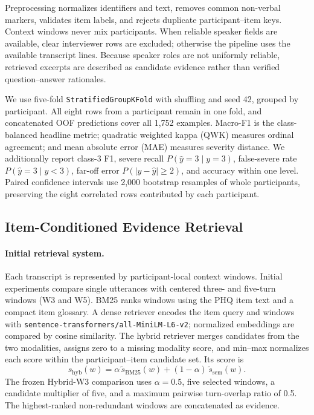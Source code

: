 \documentclass{article}
\begin{document}
Preprocessing normalizes identifiers and text, removes common non-verbal markers, validates item labels, and rejects duplicate participant--item keys. Context windows never mix participants. When reliable speaker fields are available, clear interviewer rows are excluded; otherwise the pipeline uses the available transcript lines. Because speaker roles are not uniformly reliable, retrieved excerpts are described as candidate evidence rather than verified question--answer rationales.

We use five-fold \texttt{StratifiedGroupKFold} with shuffling and seed 42, grouped by participant. All eight rows from a participant remain in one fold, and concatenated OOF predictions cover all 1,752 examples. Macro-F1 is the class-balanced headline metric; quadratic weighted kappa (QWK) measures ordinal agreement; and mean absolute error (MAE) measures severity distance. We additionally report class-3 F1, severe recall $P(\hat y=3\mid y=3)$, false-severe rate $P(\hat y=3\mid y<3)$, far-off error $P(|y-\hat y|\geq2)$, and accuracy within one level. Paired confidence intervals use 2,000 bootstrap resamples of whole participants, preserving the eight correlated rows contributed by each participant.

\subsection{Item-Conditioned Evidence Retrieval}
\label{subsec:retrieval}
\paragraph{Initial retrieval system.}
Each transcript is represented by participant-local context windows. Initial experiments compare single utterances with centered three- and five-turn windows (W3 and W5). BM25 ranks windows using the PHQ item text and a compact item glossary. A dense retriever encodes the item query and windows with \texttt{sentence-transformers/all-MiniLM-L6-v2}; normalized embeddings are compared by cosine similarity. The hybrid retriever merges candidates from the two modalities, assigns zero to a missing modality score, and min--max normalizes each score within the participant--item candidate set. Its score is
\begin{equation}
 s_{\mathrm{hyb}}(w)=\alpha\,\widetilde{s}_{\mathrm{BM25}}(w)
 +(1-\alpha)\,\widetilde{s}_{\mathrm{sem}}(w).
\end{equation}
The frozen Hybrid-W3 comparison uses $\alpha=0.5$, five selected windows, a candidate multiplier of five, and a maximum pairwise turn-overlap ratio of 0.5. The highest-ranked non-redundant windows are concatenated as evidence.
\end{document}
